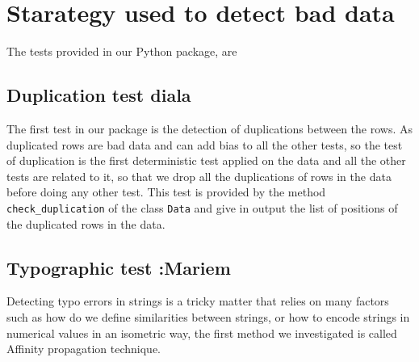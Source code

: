 \documentclass{article}
\begin{document}
\section{Starategy used to detect bad data}
\label{sec:Starategy used to detect bad data}
The tests provided in our Python package, are


\subsection{Duplication test diala} %
\label{sub:Duplication test}
The first test in our package is the detection of duplications between the rows.  As duplicated rows are bad data and can add bias to all the other tests, so the test of duplication is the first deterministic test applied on the data and all the other tests are related to it, so that we drop all the duplications of rows in the data before doing any other test. This test is provided by the method \texttt{check\_duplication} of the class \texttt{Data} and give in output the list of positions of the duplicated rows in the data.


\subsection{Typographic test :Mariem} %
\label{sub:Typographic test}
Detecting typo errors in strings is a tricky matter that relies on many factors such as how do we define similarities between strings, or how to encode strings in numerical values in an isometric way, the first method we investigated is called Affinity propagation technique.
\end{document}
